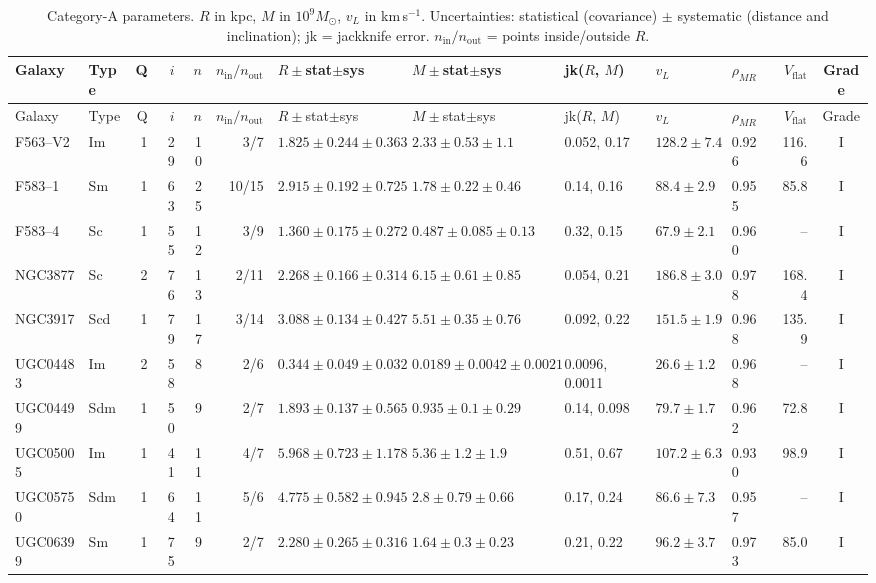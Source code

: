 \documentclass[10pt]{article}
\begin{document}
\clearpage\begin{landscape}{\scriptsize\setlength{\tabcolsep}{3.5pt}
\begin{longtable}{llrrrrlllllrc}
\caption{Category-A parameters. $R$ in kpc, $M$ in $10^9M_\odot$, $v_L$ in km\,s$^{-1}$. Uncertainties: statistical (covariance) $\pm$ systematic (distance and inclination); jk = jackknife error. $n_\mathrm{in}/n_\mathrm{out}$ = points inside/outside $R$.}\\\toprule
Galaxy & Type & Q & $i$ & $n$ & $n_\mathrm{in}/n_\mathrm{out}$ & $R\pm$stat$\pm$sys & $M\pm$stat$\pm$sys & jk($R$, $M$) & $v_L$ & $\rho_{MR}$ & $V_\mathrm{flat}$ & Grade\\\midrule\endfirsthead
\toprule Galaxy & Type & Q & $i$ & $n$ & $n_\mathrm{in}/n_\mathrm{out}$ & $R\pm$stat$\pm$sys & $M\pm$stat$\pm$sys & jk($R$, $M$) & $v_L$ & $\rho_{MR}$ & $V_\mathrm{flat}$ & Grade\\\midrule\endhead\bottomrule\endfoot
F563--V2 & Im & 1 & 29 & 10 & 3/7 & $1.825\pm0.244\pm0.363$ & $2.33\pm0.53\pm1.1$ & 0.052, 0.17 & $128.2\pm7.4$ & 0.926 & 116.6 & I\\
F583--1 & Sm & 1 & 63 & 25 & 10/15 & $2.915\pm0.192\pm0.725$ & $1.78\pm0.22\pm0.46$ & 0.14, 0.16 & $88.4\pm2.9$ & 0.955 & 85.8 & I\\
F583--4 & Sc & 1 & 55 & 12 & 3/9 & $1.360\pm0.175\pm0.272$ & $0.487\pm0.085\pm0.13$ & 0.32, 0.15 & $67.9\pm2.1$ & 0.960 & -- & I\\
NGC3877 & Sc & 2 & 76 & 13 & 2/11 & $2.268\pm0.166\pm0.314$ & $6.15\pm0.61\pm0.85$ & 0.054, 0.21 & $186.8\pm3.0$ & 0.978 & 168.4 & I\\
NGC3917 & Scd & 1 & 79 & 17 & 3/14 & $3.088\pm0.134\pm0.427$ & $5.51\pm0.35\pm0.76$ & 0.092, 0.22 & $151.5\pm1.9$ & 0.968 & 135.9 & I\\
UGC04483 & Im & 2 & 58 & 8 & 2/6 & $0.344\pm0.049\pm0.032$ & $0.0189\pm0.0042\pm0.0021$ & 0.0096, 0.0011 & $26.6\pm1.2$ & 0.968 & -- & I\\
UGC04499 & Sdm & 1 & 50 & 9 & 2/7 & $1.893\pm0.137\pm0.565$ & $0.935\pm0.1\pm0.29$ & 0.14, 0.098 & $79.7\pm1.7$ & 0.962 & 72.8 & I\\
UGC05005 & Im & 1 & 41 & 11 & 4/7 & $5.968\pm0.723\pm1.178$ & $5.36\pm1.2\pm1.9$ & 0.51, 0.67 & $107.2\pm6.3$ & 0.930 & 98.9 & I\\
UGC05750 & Sdm & 1 & 64 & 11 & 5/6 & $4.775\pm0.582\pm0.945$ & $2.8\pm0.79\pm0.66$ & 0.17, 0.24 & $86.6\pm7.3$ & 0.957 & -- & I\\
UGC06399 & Sm & 1 & 75 & 9 & 2/7 & $2.280\pm0.265\pm0.316$ & $1.64\pm0.3\pm0.23$ & 0.21, 0.22 & $96.2\pm3.7$ & 0.973 & 85.0 & I\\

\end{longtable}}
\end{landscape}
\end{document}
